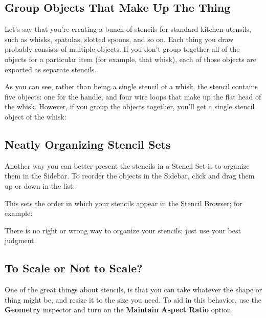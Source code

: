 \documentclass[../main.tex]{subfiles}
\begin{document}

\subsection{Group Objects That Make Up The Thing}

Let's say that you're creating a bunch of stencils for standard kitchen utensils, such as
whisks, spatulas, slotted spoons, and so on. Each thing you draw probably consists of multiple
objects. If you don't group together all of the objects for a particular item (for example,
that whisk), each of those objects are exported as separate stencils.


As you can see, rather than being a single stencil of a whisk, the stencil contains five
objects: one for the handle, and four wire loops that make up the flat head of the whisk.
However, if you group the objects together, you'll get a single stencil object of the whisk:


\subsection{Neatly Organizing Stencil Sets}

Another way you can better present the stencils in a Stencil Set is to organize them in the
Sidebar. To reorder the objects in the Sidebar, click and drag them up or down in the list:


This sets the order in which your stencils appear in the Stencil Browser; for example:


There is no right or wrong way to organize your stencils; just use your best judgment.

\subsection{To Scale or Not to Scale?}

One of the great things about stencils, is that you can take whatever the shape or thing might
be, and resize it to the size you need. To aid in this behavior, use the \textbf{Geometry}
inspector and turn on the \textbf{Maintain Aspect Ratio} option.
\end{document}
